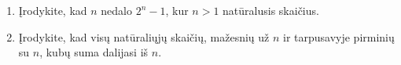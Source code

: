 \begin{enumerate}
  \item Įrodykite, kad $n$ nedalo $2^n - 1$, kur $n > 1$ natūralusis
    skaičius.  
  \item \text{[Ireland 1992]} Įrodykite, kad visų natūraliųjų skaičių,
    mažesnių už $n$ ir tarpusavyje pirminių su $n$, kubų suma dalijasi iš
    $n$.

\end{enumerate}
